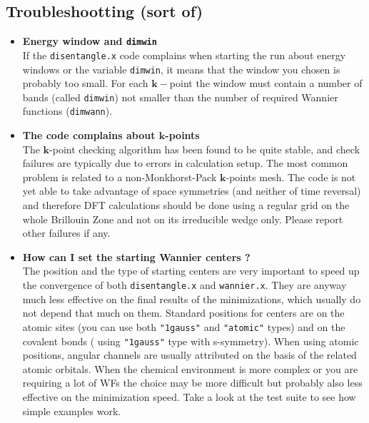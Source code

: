 \subsection{Troubleshootting (sort of)}
\label{subsec:troubleshoot}

%
%
\begin{itemize}
\item   {\bf Energy window and {\tt dimwin}} \\
        If the {\tt disentangle.x} code complains when starting the run about
        energy windows or the variable {\tt dimwin}, it means that the window you
        chosen is probably too small.  For each $\mathbf{k}-$point the window
        must contain a number of bands (called {\tt dimwin}) not smaller than
        the number of required Wannier functions ({\tt dimwann}).

\item   {\bf The code complains about $\mathbf{k}$-points} \\
        The $\mathbf{k}$-point checking algorithm has been found to be quite stable,
        and check failures are typically due to errors in calculation setup.
        The most common problem is related to a non-Monkhorst-Pack $\mathbf{k}$-points
        mesh. The code is not yet able to take advantage of space symmetries (and
        neither of time reversal) and therefore DFT calculations should be done using
        a regular grid on the whole Brillouin Zone and not on its irreducible wedge only.
        Please report other failures if any.

\item   {\bf How can I set the starting Wannier centers ? } \\
        The position and the type of starting centers are very important to speed up
        the convergence of both {\tt disentangle.x} and {\tt wannier.x}. They are
        anyway much less effective on the final results of the minimizations,
        which usually do not depend that much on them. Standard positions for
        centers are on the atomic sites (you can use both {\tt "1gauss"} and
        {\tt "atomic"} types) and on the covalent bonds ( using {\tt "1gauss"} type
        with s-symmetry). When using atomic positions, angular channels are usually
        attributed on the basis of the related atomic orbitals.
        When the chemical environment is more complex or you are
        requiring a lot of WFs the choice may be more difficult but probably also
        less effective on the minimization speed. Take a look at the
        test suite to see how simple examples work.


\end{itemize}
